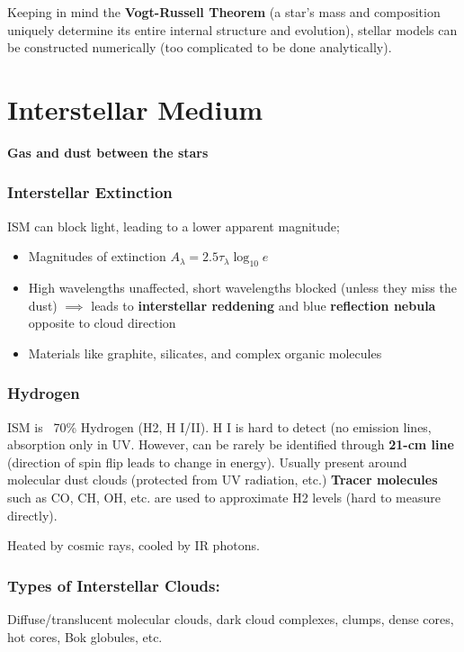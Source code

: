 \documentclass[12pt]{article}
\begin{document}
Keeping in mind the \textbf{Vogt-Russell Theorem} (a star's mass and composition uniquely determine its entire internal structure and evolution), stellar models can be constructed numerically (too complicated to be done analytically).

\section{Interstellar Medium}
\textbf{Gas and dust between the stars}
\subsubsection{Interstellar Extinction}
ISM can block light, leading to a lower apparent magnitude;
\begin{itemize}
    \item Magnitudes of extinction $A_\lambda = 2.5\tau_\lambda \log_{10}e$
    \item High wavelengths unaffected, short wavelengths blocked (unless they miss the dust) $\implies$ leads to \textbf{interstellar reddening} and blue \textbf{reflection nebula} opposite to cloud direction
    \item Materials like graphite, silicates, and complex organic molecules
\end{itemize}
\subsubsection{Hydrogen}
ISM is ~70\% Hydrogen (H2, H I/II). 
H I is hard to detect (no emission lines, absorption only in UV. However, can be rarely be identified through \textbf{21-cm line} (direction of spin flip leads to change in energy). Usually present around molecular dust clouds (protected from UV radiation, etc.)\newline
\textbf{Tracer molecules} such as CO, CH, OH, etc. are used to approximate H2 levels (hard to measure directly).

Heated by cosmic rays, cooled by IR photons.

\subsubsection{Types of Interstellar Clouds:}
Diffuse/translucent molecular clouds, dark cloud complexes, clumps, dense cores, hot cores, Bok globules, etc.
\end{document}
